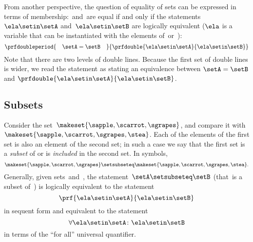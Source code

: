 From another perspective, the question of equality of sets can be expressed in terms of membership:~\setA and~\setB are equal if and only if the statements~$\ela \setin\setA$ and~$\ela \setin\setB$ are logically equivalent ($\ela$ is a variable that can be instantiated with the elements of~\setA or~\setB):
%
\begin{equation}
    \prfdoubleperiod{
        \quad \setA = \setB \quad
    }{
        \prfdouble{
            \ela \setin\setA
        }{
            \ela \setin\setB
        }
    }
\end{equation}
Note that there are two levels of double lines.
Because the first set of double lines is wider, we read the statement as stating an equivalence between $\setA = \setB$ and $\prfdouble{
        \ela \setin\setA
    }{
        \ela \setin\setB
    }$.


\subsection{Subsets}
\label{sec:set-inclusion}
Consider the set~$\makeset{ \sapple, \scarrot, \sgrapes }$, and compare it with~$\makeset{ \sapple, \scarrot, \sgrapes, \stea }$.
Each of the elements of the first set is also an element of the second set;
in such a case we say that the first set is a \emph{subset} of or is \emph{included} in the second set.
In symbols,
%
\begin{equation}
    \label{eq:subset}
    \makeset{ \sapple, \scarrot, \sgrapes } \setsubseteq \makeset{ \sapple, \scarrot, \sgrapes, \stea }.
\end{equation}
%
Generally, given sets~\setA and~\setB, the statement~$\setA \setsubseteq \setB$ (that~\setA is a subset of~\setB) is logically equivalent to the statement
%
\begin{equation}
    \prf{
        \ela \setin\setA
    }{
        \ela \setin\setB
    }
\end{equation}
in sequent form and equivalent to the statement
\begin{equation}
    \label{eq:inclusion-via-quantifier}
    \forall \ela \setin\setA \colon \ela \setin\setB
\end{equation}
in terms of the ``for all'' universal quantifier.

